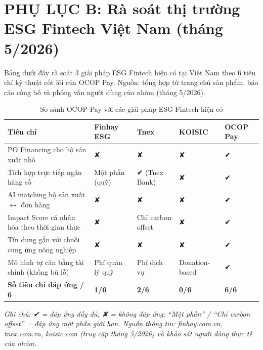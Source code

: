 \documentclass[13pt,a4paper]{extarticle}
\begin{document}
\newpage
\section*{PHỤ LỤC B: Rà soát thị trường ESG Fintech Việt Nam (tháng 5/2026)}
\label{phulucB}

Bảng dưới đây rà soát 3 giải pháp ESG Fintech hiện có tại Việt Nam theo 6 tiêu chí kỹ thuật cốt lõi của OCOP Pay. Nguồn: tổng hợp từ trang chủ sản phẩm, báo cáo công bố và phỏng vấn người dùng của nhóm (tháng 5/2026).

\begin{table}[H]
\centering
\caption{So sánh OCOP Pay với các giải pháp ESG Fintech hiện có}
\begin{tabular}{|p{4cm}|p{2cm}|p{2cm}|p{2cm}|p{2.5cm}|}
\hline
\textbf{Tiêu chí} & \textbf{Finhay ESG} & \textbf{Tnex} & \textbf{KOISIC} & \textbf{OCOP Pay} \\
\hline
PO Financing cho hộ sản xuất nhỏ & ✘ & ✘ & ✘ & ✔ \\
\hline
Tích hợp trực tiếp ngân hàng số & Một phần (quỹ) & ✔ (Tnex Bank) & ✘ & ✔ \\
\hline
AI matching hộ sản xuất $\leftrightarrow$ đơn hàng & ✘ & ✘ & ✘ & ✔ \\
\hline
Impact Score cá nhân hóa theo thời gian thực & ✘ & Chỉ carbon offset & ✘ & ✔ \\
\hline
Tín dụng gắn với chuỗi cung ứng nông nghiệp & ✘ & ✘ & ✘ & ✔ \\
\hline
Mô hình tự cân bằng tài chính (không bù lỗ) & Phí quản lý quỹ & Phí dịch vụ & Donation-based & ✔ \\
\hline
\textbf{Số tiêu chí đáp ứng / 6} & \textbf{1/6} & \textbf{2/6} & \textbf{0/6} & \textbf{6/6} \\
\hline
\end{tabular}
\end{table}

\textit{Ghi chú: ✔ = đáp ứng đầy đủ; ✘ = không đáp ứng; ``Một phần'' / ``Chỉ carbon offset'' = đáp ứng một phần giới hạn. Nguồn thông tin: finhay.com.vn, tnex.com.vn, koisic.com (truy cập tháng 5/2026) và khảo sát người dùng thực tế của nhóm.}
\end{document}

